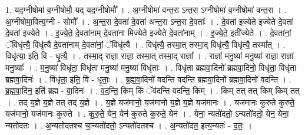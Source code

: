 \documentclass[17pt]{extarticle}
\begin{document}
1. यद॒ग्नीषोमा॑ व॒ग्नीषोमौ॒ यद् यद॒ग्नीषोमौ᳚ । . अ॒ग्नीषोमा॑ वन्त॒रा ऽन्त॒रा ऽग्नीषोमा॑ व॒ग्नीषोमा॑ वन्त॒रा । . अ॒ग्नीषोमा॒वित्य॒ग्नी - सोमौ᳚ । . अ॒न्त॒रा दे॒वता॑ दे॒वता॑ अन्त॒रा ऽन्त॒रा दे॒वताः᳚ । . दे॒वता॑ इज्येते इज्येते दे॒वता॑ दे॒वता॑ इज्येते । . इ॒ज्ये॒ते॒ दे॒वता॑नाम् दे॒वता॑ना मिज्येते इज्येते दे॒वता॑नाम् । . इ॒ज्ये॒ते॒ इती᳚ज्येते । . दे॒वता॑नां॒ ॅविधृ॑त्यै॒ विधृ॑त्यै दे॒वता॑नाम् दे॒वता॑नां॒ ॅविधृ॑त्यै । . विधृ॑त्यै॒ तस्मा॒त् तस्मा॒द् विधृ॑त्यै॒ विधृ॑त्यै॒ तस्मा᳚त् । . विधृ॑त्या॒ इति॒ वि - धृ॒त्यै॒ । . तस्मा॒द् राज्ञा॒ राज्ञा॒ तस्मा॒त् तस्मा॒द् राज्ञा᳚ । . राज्ञा॑ मनु॒ष्या॑ मनु॒ष्या॑ राज्ञा॒ राज्ञा॑ मनु॒ष्याः᳚ । . म॒नु॒ष्या॑ विधृ॑ता॒ विधृ॑ता मनु॒ष्या॑ मनु॒ष्या॑ विधृ॑ताः । . विधृ॑ता ब्रह्मवा॒दिनो᳚ ब्रह्मवा॒दिनो॒ विधृ॑ता॒ विधृ॑ता ब्रह्मवा॒दिनः॑ । . विधृ॑ता॒ इति॒ वि - धृ॒ताः॒ । . ब्र॒ह्म॒वा॒दिनो॑ वदन्ति वदन्ति ब्रह्मवा॒दिनो᳚ ब्रह्मवा॒दिनो॑ वदन्ति । . ब्र॒ह्म॒वा॒दिन॒ इति॑ ब्रह्म - वा॒दिनः॑ । . व॒द॒न्ति॒ किम् किं ॅव॑दन्ति वदन्ति॒ किम् । . किम् तत् तत् किम् किम् तत् । . तद् य॒ज्ञे य॒ज्ञे तत् तद् य॒ज्ञे । . य॒ज्ञे यज॑मानो॒ यज॑मानो य॒ज्ञे य॒ज्ञे यज॑मानः । . यज॑मानः कुरुते कुरुते॒ यज॑मानो॒ यज॑मानः कुरुते । . कु॒रु॒ते॒ येन॒ येन॑ कुरुते कुरुते॒ येन॑ । . येना॒ न्यतो॑दतो॒ ऽन्यतो॑दतो॒ येन॒ येना॒ न्यतो॑दतः । . अ॒न्यतो॑दतश्च चा॒न्यतो॑दतो॒ ऽन्यतो॑दतश्च । . अ॒न्यतो॑दत॒ इत्य॒न्यतः॑ - द॒तः॒ । \newline
\end{document}

